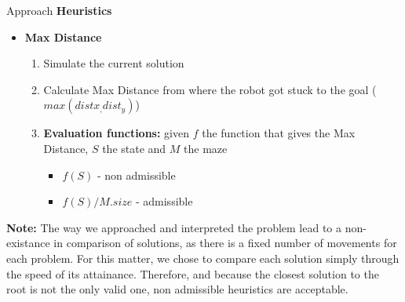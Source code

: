 \begin{frame}{Approach}
    \textbf{Heuristics}
    \begin{itemize}
        \item \textbf{Max Distance}
        \begin{enumerate}
            \item Simulate the current solution
            \item Calculate Max Distance from where the robot got stuck to the goal ($max(distx_, dist_y)$)
            \item \textbf{Evaluation functions:} given $f$ the function that gives the Max Distance, $S$ the state and $M$ the maze
            \begin{itemize}
                \item $f(S)$ - non admissible
                \item $f(S) / M.size$ - admissible
            \end{itemize}
        \end{enumerate}
    \end{itemize}
    
    \textbf{Note:} The way we approached and interpreted the problem lead to a non-existance in comparison of solutions, as there is a fixed number of movements for each problem. For this matter, we chose to compare each solution simply through the speed of its attainance. Therefore, and because the closest solution to the root is not the only valid one, non admissible heuristics are acceptable. 
    
\end{frame}

